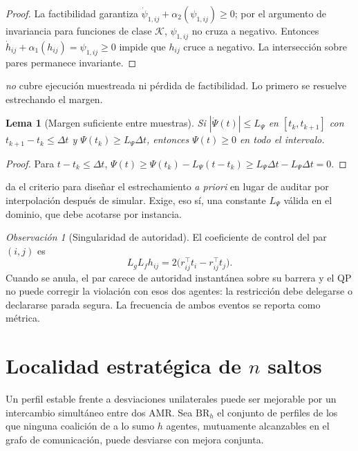 \documentclass[11pt,a4paper]{article}
\theoremstyle{plain}
\newtheorem{lema}[teorema]{Lema}
\theoremstyle{definition}
\theoremstyle{remark}
\newtheorem{observacion}[teorema]{Observación}
\newcommand{\T}{^{\!\top}}
\begin{document}
\begin{proof}
La factibilidad garantiza $\dot\psi_{1,ij}+\alpha_2(\psi_{1,ij})\ge0$; por el
argumento de invariancia para funciones de clase $\mathcal K$, $\psi_{1,ij}$ no
cruza a negativo. Entonces
$\dot h_{ij}+\alpha_1(h_{ij})=\psi_{1,ij}\ge0$ impide que $h_{ij}$ cruce a
negativo. La intersección sobre pares permanece invariante.
\end{proof}

 \emph{no} cubre ejecución muestreada ni pérdida de
factibilidad. Lo primero se resuelve estrechando el margen.

\begin{lema}[Margen suficiente entre muestras]
\label{le:muestras}
Si $|\dot\Psi(t)|\le L_\Psi$ en $[t_k,t_{k+1}]$ con
$t_{k+1}-t_k\le\Delta t$ y $\Psi(t_k)\ge L_\Psi\Delta t$, entonces
$\Psi(t)\ge0$ en todo el intervalo.
\end{lema}

\begin{proof}
Para $t-t_k\le\Delta t$,
$\Psi(t)\ge\Psi(t_k)-L_\Psi(t-t_k)\ge L_\Psi\Delta t-L_\Psi\Delta t=0$.
\end{proof}

 da el criterio para diseñar el estrechamiento \emph{a
priori} en lugar de auditar por interpolación después de simular. Exige, eso sí,
una constante $L_\Psi$ válida en el dominio, que debe acotarse por instancia.

\begin{observacion}[Singularidad de autoridad]
\label{obs:autoridad}
El coeficiente de control del par $(i,j)$ es
\[
  L_gL_fh_{ij}=2\bigl(r_{ij}\T t_i-r_{ij}\T t_j\bigr).
\]
Cuando se anula, el par carece de autoridad instantánea sobre su barrera y el QP no puede corregir la violación
con esos dos agentes: la restricción debe delegarse o declararse parada segura.
La frecuencia de ambos eventos se reporta como métrica.
\end{observacion}


\section{Localidad estratégica de $n$ saltos}
\label{sec:nhop}

Un perfil estable frente a desviaciones unilaterales puede ser mejorable por un
intercambio simultáneo entre dos AMR. Sea $\mathrm{BR}_h$ el conjunto de
perfiles de los que ninguna coalición de a lo sumo $h$ agentes, mutuamente
alcanzables en el grafo de comunicación, puede desviarse con mejora conjunta.
\end{document}
